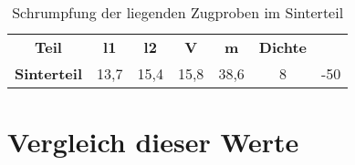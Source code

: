 \begin{table}[h]
    \centering
    \caption{Schrumpfung der liegenden Zugproben im Sinterteil}
      \begin{tabular}{ccccccc}
      \toprule
      \textbf{Teil} & \multicolumn{1}{c}{\textbf{l1}} & \multicolumn{1}{c}{\textbf{l2}} & \multicolumn{1}{c}{\textbf{V}} & \multicolumn{1}{c}{\textbf{m}} & \multicolumn{1}{c}{\textbf{Dichte}} \\
        \textbf{Sinterteil} & 13,7 & 15,4 & 15,8 & 38,6 & 8 & -50 \\
      \bottomrule
      \end{tabular}%
    \label{Schrumpfung Zugproben}%
  \end{table}%
  \FloatBarrier

\section{Vergleich dieser Werte}